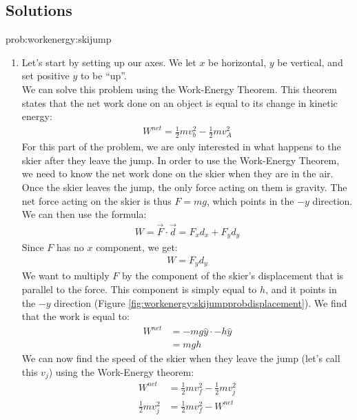 \newpage
\subsection{Solutions}
\begin{solution}{prob:workenergy:skijump}\label{soln:workenergy:skijump}
\begin{enumerate}[label=\alph*)]
\item Let's start by setting up our axes. We let $x$ be horizontal, $y$ be vertical, and set positive $y$ to be ``up''. \\

We can solve this problem using the Work-Energy Theorem. This theorem states that the net work done on an object is equal to its change in kinetic energy:
\begin{align*}
W^{net}=\frac{1}{2}mv_b^2-\frac{1}{2}mv_A^2
\end{align*}
For this part of the problem, we are only interested in what happens to the skier after they leave the jump. In order to use the Work-Energy Theorem, we need to know the net work done on the skier when they are in the air. Once the skier leaves the jump, the only force acting on them is gravity. The net force acting on the skier is thus $F=mg$, which points in the $-y$ direction. We can then use the formula: 
\begin{align*}
W=\vec F \cdot \vec d = F_xd_x+F_yd_y
\end{align*}
Since $F$ has no $x$ component, we get:
\begin{align*}
W=F_yd_y
\end{align*}
We want to multiply $F$ by the component of the skier's displacement that is parallel to the force. This component is simply equal to $h$, and it points in the $-y$ direction (Figure \ref{fig:workenergy:skijumpprobdisplacement}).
 We find that the work is equal to:
\begin{align*}
W^{net}&=-mg\hat y \cdot -h\hat y\\
&=mgh
\end{align*}
We can now find the speed of the skier when they leave the jump (let's call this $v_j$) using the Work-Energy theorem:
\begin{align*}
W^{net}&=\frac{1}{2}mv_f^2-\frac{1}{2}mv_j^2\\
\frac{1}{2}mv_j^2&=\frac{1}{2}mv_f^2-W^{net}\\

\end{align*}
\end{enumerate}
\end{solution}
